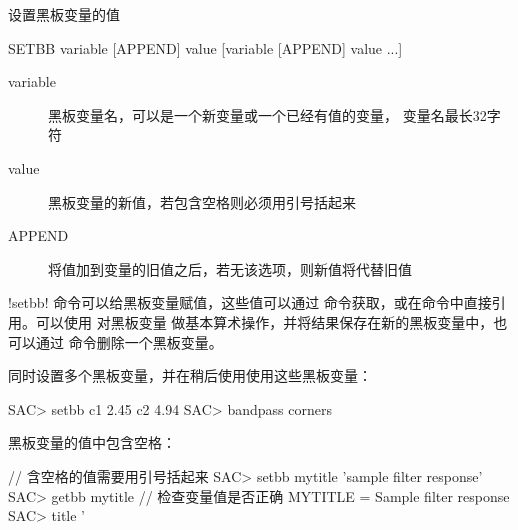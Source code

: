 \label{cmd:setbb}

设置黑板变量的值

\begin{SACSTX}
SETBB variable [APPEND] value [variable [APPEND] value ...]
\end{SACSTX}

\begin{description}
\item [variable] 黑板变量名，可以是一个新变量或一个已经有值的变量，
    变量名最长32字符
\item [value] 黑板变量的新值，若包含空格则必须用引号括起来
\item [APPEND] 将值加到变量的旧值之后，若无该选项，则新值将代替旧值
\end{description}

!setbb! 命令可以给黑板变量赋值，这些值可以通过 
命令获取，或在命令中直接引用。可以使用  对黑板变量
做基本算术操作，并将结果保存在新的黑板变量中，也可以通过 
命令删除一个黑板变量。

同时设置多个黑板变量，并在稍后使用使用这些黑板变量：
\begin{SACCode}
SAC> setbb c1 2.45 c2 4.94
SAC> bandpass corners %
\end{SACCode}

黑板变量的值中包含空格：
\begin{SACCode}
                            // 含空格的值需要用引号括起来
SAC> setbb mytitle 'sample filter response'
SAC> getbb mytitle          // 检查变量值是否正确
 MYTITLE = Sample filter response
SAC> title '%
\end{SACCode}
